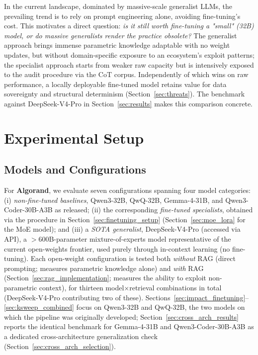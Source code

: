 \documentclass[lettersize,journal]{IEEEtran}
\begin{document}
In the current landscape, dominated by massive-scale generalist LLMs, the prevailing trend is to
rely on prompt engineering alone, avoiding fine-tuning's cost. This motivates a direct question:
\emph{is it still worth fine-tuning a "small" (32B) model, or do massive generalists render the
practice obsolete?} The generalist approach brings immense parametric knowledge adaptable with no
weight updates, but without domain-specific exposure to an ecosystem's exploit patterns; the
specialist approach starts from weaker raw capacity but is intensively exposed to the audit
procedure via the CoT corpus. Independently of which wins on raw performance, a locally deployable
fine-tuned model retains value for data sovereignty and structural determinism
(Section~\ref{sec:threats}). The benchmark against DeepSeek-V4-Pro in Section~\ref{sec:results}
makes this comparison concrete.

\section{Experimental Setup}
\label{sec:experiments}

\subsection{Models and Configurations}
\label{sec:exp_setup}
For \textbf{Algorand}, we evaluate seven configurations spanning four model categories: (i)
\emph{non-fine-tuned baselines}, Qwen3-32B, QwQ-32B, Gemma-4-31B, and Qwen3-Coder-30B-A3B as
released; (ii) the corresponding \emph{fine-tuned specialists}, obtained via the procedure in
Section~\ref{sec:finetuning_setup} (Section~\ref{sec:moe_lora} for the MoE model); and (iii) a
\emph{SOTA generalist}, DeepSeek-V4-Pro \cite{deepseek_v3_2024} (accessed via API), a
$>$600B-parameter mixture-of-experts model representative of the current open-weights frontier, used
purely through in-context learning (no fine-tuning). Each open-weight configuration is tested both
\emph{without} RAG (direct prompting; measures parametric knowledge alone) and \emph{with} RAG
(Section~\ref{sec:rag_implementation}; measures the ability to exploit non-parametric context), for
thirteen model$\times$retrieval combinations in total (DeepSeek-V4-Pro contributing two of these).
Sections~\ref{sec:impact_finetuning}--\ref{sec:ksweep_combined} focus on Qwen3-32B and QwQ-32B,
the two models on which the pipeline was originally developed; Section~\ref{sec:cross_arch_results}
reports the identical benchmark for Gemma-4-31B and Qwen3-Coder-30B-A3B as a dedicated
cross-architecture generalization check (Section~\ref{sec:cross_arch_selection}).
\end{document}
